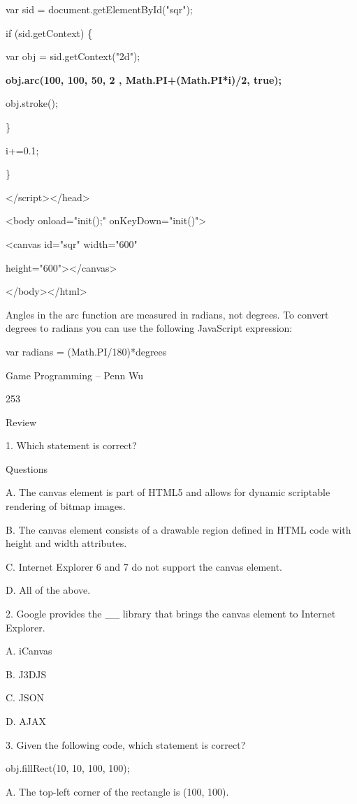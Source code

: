 \documentclass[
]{article}
\begin{document}
var sid = document.getElementById("sqr");

if (sid.getContext) \{

var obj = sid.getContext("2d");

\textbf{obj.arc(100, 100, 50, 2 , Math.PI+(Math.PI*i)/2, true);}

obj.stroke();

\}

i+=0.1;

\}

\textless/script\textgreater\textless/head\textgreater{}

\textless body onload="init();" onKeyDown="init()"\textgreater{}

\textless canvas id="sqr" width="600"

height="600"\textgreater\textless/canvas\textgreater{}

\textless/body\textgreater\textless/html\textgreater{}

Angles in the arc function are measured in radians, not degrees. To
convert degrees to radians you can use the following JavaScript
expression:

var radians = (Math.PI/180)*degrees

Game Programming -- Penn Wu

253

\protect\hypertarget{index_split_013.htmlux5cux23p254}{}{}

Review

1. Which statement is correct?

Questions

A. The canvas element is part of HTML5 and allows for dynamic scriptable
rendering of bitmap images.

B. The canvas element consists of a drawable region defined in HTML code
with height and width attributes.

C. Internet Explorer 6 and 7 do not support the canvas element.

D. All of the above.

2. Google provides the \_\_ library that brings the canvas element to
Internet Explorer.

A. iCanvas

B. J3DJS

C. JSON

D. AJAX

3. Given the following code, which statement is correct?

obj.fillRect(10, 10, 100, 100);

A. The top-left corner of the rectangle is (100, 100).
\end{document}
